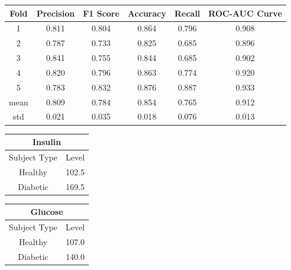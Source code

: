 \documentclass[12pt]{article}
\begin{document}
{
\clearpage
\centering
\begin{table}[]
\centering
\begin{tabular}{|c|c|c|c|c|c|}
\hline
Fold & Precision & F1 Score & Accuracy & Recall & ROC-AUC Curve \\ \hline
1    & 0.811     & 0.804    & 0.864    & 0.796  & 0.908         \\ \hline
2    & 0.787     & 0.733    & 0.825    & 0.685  & 0.896         \\ \hline
3    & 0.841     & 0.755    & 0.844    & 0.685  & 0.902         \\ \hline
4    & 0.820     & 0.796    & 0.863    & 0.774  & 0.920         \\ \hline
5    & 0.783     & 0.832    & 0.876    & 0.887  & 0.933         \\ \hline
mean & 0.809     & 0.784    & 0.854    & 0.765  & 0.912         \\ \hline
std  & 0.021     & 0.035    & 0.018    & 0.076  & 0.013         \\ \hline
\end{tabular}
\label{table:7}
\end{table}

}


\begin{table}[]
\centering
\begin{tabular}{|c|c|}
\hline
\multicolumn{2}{|c|}{Insulin} \\ \hline
Subject Type      & Level     \\ \hline
Healthy           & 102.5     \\ \hline
Diabetic          & 169.5     \\ \hline
\end{tabular}
\label{table:8}
\end{table}


\begin{table}[]
\centering
\begin{tabular}{|c|c|}
\hline
\multicolumn{2}{|c|}{Glucose} \\ \hline
Subject Type      & Level     \\ \hline
Healthy           & 107.0     \\ \hline
Diabetic          & 140.0     \\ \hline
\end{tabular}
\label{table:9}

\end{table}
\end{document}
